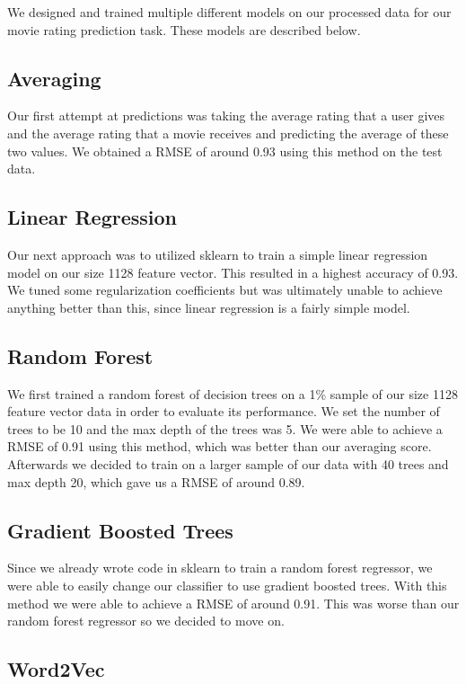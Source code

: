 \documentclass{sig-alternate-05-2015}
\begin{document}
We designed and trained multiple different models on our processed data for our movie rating prediction task. These models are described below.

\subsection{Averaging}

Our first attempt at predictions was taking the average rating that a user gives and the average rating that a movie receives and predicting
the average of these two values. We obtained a RMSE of around 0.93 using this method on the test data.

\subsection{Linear Regression}

Our next approach was to utilized sklearn to train a simple linear regression model on our size 1128
feature vector. This resulted in a highest accuracy of 0.93. We tuned some regularization coefficients
but was ultimately unable to achieve anything better than this, since linear regression is a fairly simple
model.

\subsection{Random Forest}

We first trained a random forest of decision trees on a 1\% sample of our size 1128 feature vector data
in order to evaluate its performance. We set the number of trees to be 10 and the max depth of the trees was 5.
We were able to achieve a RMSE of 0.91 using this method, which was better than our averaging score. Afterwards
we decided to train on a larger sample of our data with 40 trees and max depth 20, which gave us a RMSE
of around 0.89.

\subsection{Gradient Boosted Trees}

Since we already wrote code in sklearn to train a random forest regressor, we were able to easily
change our classifier to use gradient boosted trees. With this method we were able to achieve a RMSE
of around 0.91. This was worse than our random forest regressor so we decided to move on.

\subsection{Word2Vec}
\end{document}
